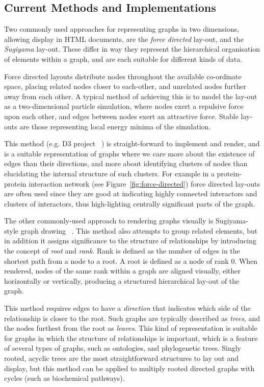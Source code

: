 \documentclass[10pt,a4paper,twocolumn]{article}
\begin{document}
\subsection*{Current Methods and Implementations}

Two commonly used approaches for representing graphs in two dimensions, allowing
display in HTML documents, are the \emph{force directed} lay-out, and the
\emph{Sugiyama} lay-out. These differ in way they represent the hierarchical
organisation of elements within a graph, and are each suitable for different
kinds of data.

Force directed layouts distribute nodes throughout the available co-ordinate
space, placing related nodes closer to each-other, and unrelated nodes further
away from each other. A typical method of achieving this is to model the lay-out
as a two-dimensional particle simulation, where nodes exert a repulsive force
upon each other, and edges between nodes exert an attractive force. Stable
lay-outs are those representing local energy minima of the simulation. 

This method (e.g. D3 project ~\cite{d3}) is straight-forward to implement and
render, and is a suitable representation of graphs where we care more about the
existence of edges than their directions, and more about identifying clusters of
nodes than elucidating the internal structure of such clusters. For example in a
protein-protein interaction network (see Figure~\ref{fig:force-directed}) force
directed lay-outs are often used since they are good at indicating highly
connected interactors and clusters of interactors, thus high-lighting centrally
significant parts of the graph. 

The other commonly-used approach to rendering graphs visually is Sugiyama-style
graph drawing ~\cite{sugiyama}. This method also attempts to group related
elements, but in addition it assigns significance to the structure of
relationships by introducing the concept of \emph{root} and \emph{rank}. Rank is
defined as the number of edges in the shortest path from a node to a root. A
root is defined as a node of rank 0. When rendered, nodes of the same rank
within a graph are aligned visually, either horizontally or vertically,
producing a structured hierarchical lay-out of the graph.

This method requires edges to have a \emph{direction} that indicates which side
of the relationship is closer to the root. Such graphs are typically described
as \emph{trees}, and the nodes furthest from the root as \emph{leaves}.  This
kind of representation is suitable for graphs in which the structure of
relationships is important, which is a feature of several types of graphs, such
as ontologies, and phylogenetic trees. Singly rooted, acyclic trees are the most
straightforward structures to lay out and display, but this method can be
applied to multiply rooted directed graphs with cycles (such as biochemical
pathways). 
\end{document}
